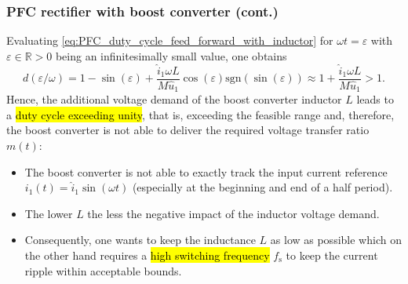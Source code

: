 \begin{frame}
    \frametitle{PFC rectifier with boost converter (cont.)}
    Evaluating \eqref{eq:PFC_duty_cycle_feed_forward_with_inductor} for $\omega t = \varepsilon$ with $\varepsilon\in\mathbb{R}>0$ being an infinitesimally small value, one obtains 
    $$
    d(\varepsilon/\omega) = 1 -\sin(\varepsilon) + \frac{\hat{i}_1\omega L}{M\hat{u}_1} \cos(\varepsilon)\mathrm{sgn}(\sin(\varepsilon)) \approx 1 +  \frac{\hat{i}_1\omega L}{M\hat{u}_1} > 1. 
    $$
    Hence, the additional voltage demand of the boost converter inductor $L$ leads to a \hl{duty cycle exceeding unity}, that is, exceeding the feasible range and, therefore, the boost converter is not able to deliver the required voltage transfer ratio $m(t)$:
    \begin{itemize}
        \item The boost converter is not able to exactly track the input current reference $i_1(t)=\hat{i}_1\sin(\omega t)$ (especially at the beginning and end of a half period).
        \item The lower $L$ the less the negative impact of the inductor voltage demand.
        \item Consequently, one wants to keep the inductance $L$ as low as possible which on the other hand requires a \hl{high switching frequency} $f_\mathrm{s}$ to keep the current ripple within acceptable bounds.
    \end{itemize}
\end{frame}

